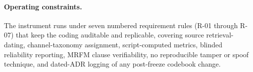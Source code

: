 \paragraph{Operating constraints.} The instrument runs under seven numbered requirement
rules (R-01 through R-07) that keep the coding auditable and replicable, covering source
retrieval-dating, channel-taxonomy assignment, script-computed metrics, blinded
reliability reporting, MRFM clause verifiability, no reproducible tamper or spoof
technique, and dated-ADR logging of any post-freeze codebook change.
